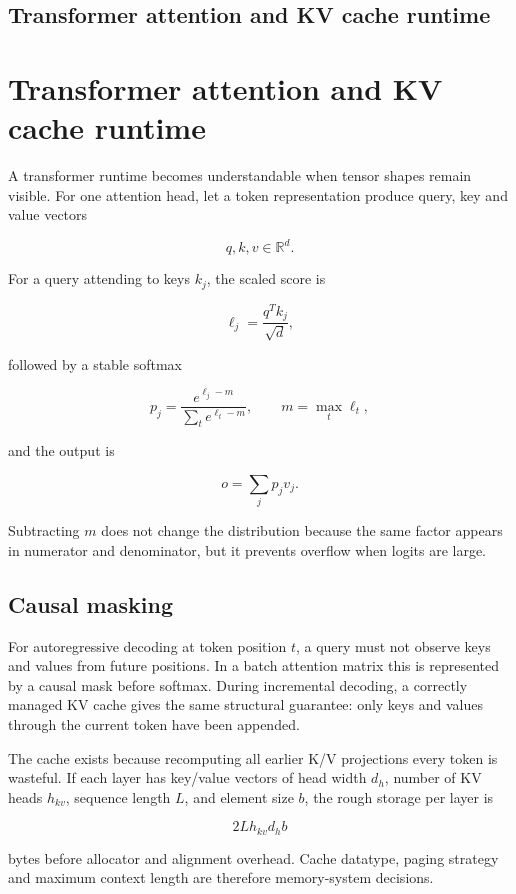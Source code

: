 \hypertarget{appendix-ea2dadd21ce5}{}
\section*{Transformer attention and KV cache runtime}
\chapter{Transformer attention and KV cache runtime}\label{appendix-ea2dadd21ce5-transformer-attention-and-kv-cache-runtime}

A transformer runtime becomes understandable when tensor shapes remain visible. For one attention head, let a token representation produce query, key and value vectors

\[
q,k,v \in \mathbb{R}^{d}.
\]

For a query attending to keys \(k_j\), the scaled score is

\[
\ell_j = \frac{q^T k_j}{\sqrt{d}},
\]

followed by a stable softmax

\[
p_j = \frac{e^{\ell_j-m}}{\sum_t e^{\ell_t-m}},
\qquad m=\max_t \ell_t,
\]

and the output is

\[
o = \sum_j p_j v_j.
\]

Subtracting \(m\) does not change the distribution because the same factor appears in numerator and denominator, but it prevents overflow when logits are large.

\section{Causal masking}\label{appendix-ea2dadd21ce5-causal-masking}

For autoregressive decoding at token position \(t\), a query must not observe keys and values from future positions. In a batch attention matrix this is represented by a causal mask before softmax. During incremental decoding, a correctly managed KV cache gives the same structural guarantee: only keys and values through the current token have been appended.

The cache exists because recomputing all earlier K/V projections every token is wasteful. If each layer has key/value vectors of head width \(d_h\), number of KV heads \(h_{kv}\), sequence length \(L\), and element size \(b\), the rough storage per layer is

\[
2 L h_{kv} d_h b
\]

bytes before allocator and alignment overhead. Cache datatype, paging strategy and maximum context length are therefore memory-system decisions.

